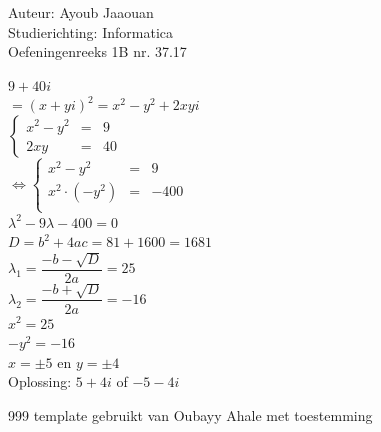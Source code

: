 \documentclass[a4paper]{article}
\begin{document}
  
\noindent \large Auteur: Ayoub Jaaouan          \\
\noindent \large Studierichting: Informatica   \\ 
\noindent \large Oefeningenreeks 1B nr. 37.17   \\

\medskip

\normalsize

$ 9+40i $\\

$ = (x + yi)^2 = x^2 - y^2 + 2xyi $\\

$\left\{
    \begin{array}{lll} 
        x^2 - y^2 &=& 9 \\
        2xy &=& 40
    \end{array}
\right .$\\

$\Leftrightarrow \left\{
    \begin{array}{lll} 
        x^2 - y^2 &=& 9 \\
        x^2 \cdot (-y^2) &=& -400 \\
    \end{array}
\right .$\\

$ \lambda^2 - 9 \lambda - 400 = 0 $ \\

$ D = b^2 + 4ac = 81 + 1600 = 1681          $\\

$ \lambda_1 = \dfrac{-b - \sqrt{D}}{2a} = 25 $\\

$ \lambda_2 = \dfrac{-b + \sqrt{D}}{2a} = -16  $\\

$ x^2 = 25 $ \\

$ -y^2 = -16 $ \\

$ x = \pm 5 $ en $ y = \pm 4 $\\

Oplossing: $ 5 + 4i $ of $ -5 - 4i $

\begin{thebibliography}{999}
 template gebruikt van Oubayy Ahale met toestemming
\end{thebibliography}
\end{document}
